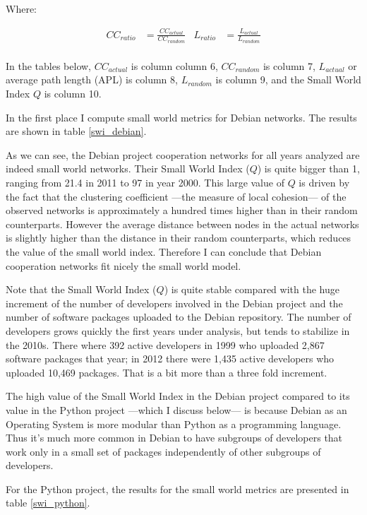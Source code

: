 Where:

\begin{align}
CC_{ratio}& = \frac{CC_{actual}}{CC_{random}} &
L_{ratio}& = \frac{L_{actual}}{L_{random}} \nonumber \\
\end{align}

In the tables below, $CC_{actual}$ is column column 6, $CC_{random}$ is column 7, $L_{actual}$ or average path length (APL) is column 8, $L_{random}$ is column 9, and the Small World Index $Q$ is column 10.

In the first place I compute small world metrics for Debian networks. The results are shown in table \ref{swi_debian}.



As we can see, the Debian project cooperation networks for all years analyzed are indeed small world networks. Their Small World Index ($Q$) is quite bigger than 1, ranging from 21.4 in 2011 to 97 in year 2000. This large value of $Q$ is driven by the fact that the clustering coefficient ---the measure of local cohesion--- of the observed networks is approximately a hundred times higher than in their random counterparts. However the average distance between nodes in the actual networks is slightly higher than the distance in their random counterparts, which reduces the value of the small world index. Therefore I can conclude that Debian cooperation networks fit nicely the small world model. 

Note that the Small World Index ($Q$) is quite stable compared with the huge increment of the number of developers involved in the Debian project and the number of software packages uploaded to the Debian repository. The number of developers grows quickly the first years under analysis, but tends to stabilize in the 2010s. There where 392 active developers in 1999 who uploaded 2,867 software packages that year; in 2012 there were 1,435 active developers who uploaded 10,469 packages. That is a bit more than a three fold increment.

The high value of the Small World Index in the Debian project compared to its value in the Python project ---which I discuss below--- is because Debian as an Operating System is more modular than Python as a programming language. Thus it's much more common in Debian to have subgroups of developers that work only in a small set of packages independently of other subgroups of developers.

For the Python project, the results for the small world metrics are presented in table \ref{swi_python}.

